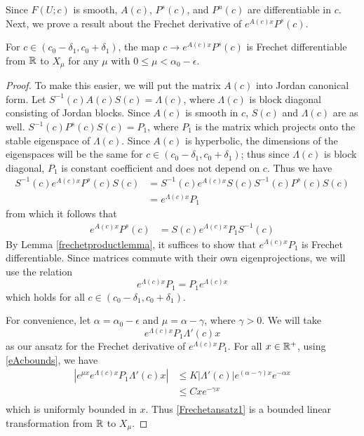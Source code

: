 \documentclass[thesis.tex]{subfiles}
\begin{document}
Since $F(U; c)$ is smooth, $A(c)$, $P^s(c)$, and $P^u(c)$ are differentiable in $c$. Next, we prove a result about the Frechet derivative of $e^{A(c)x} P^s(c)$.

\begin{lemma}\label{EAPsderiv}
For $c \in (c_0 - \delta_1, c_0 + \delta_1)$, the map $c \rightarrow e^{A(c)x} P^s(c)$ is Frechet differentiable from $\mathbb{R}$ to $X_\mu$ for any $\mu$ with $0 \leq \mu < \alpha_0 - \epsilon$.
\begin{proof}
To make this easier, we will put the matrix $A(c)$ into Jordan canonical form. Let $S^{-1}(c)A(c)S(c) = \Lambda(c)$, where $\Lambda(c)$ is block diagonal consisting of Jordan blocks. Since $A(c)$ is smooth in $c$, $S(c)$ and $\Lambda(c)$ are as well. $S^{-1}(c)P^s(c)S(c) = P_1$, where $P_1$ is the matrix which projects onto the stable eigenspace of $\Lambda(c)$. Since $A(c)$ is hyperbolic, the dimensions of the eigenspaces will be the same for $c \in (c_0 - \delta_1, c_0 + \delta_1)$; thus since $\Lambda(c)$ is block diagonal, $P_1$ is constant coefficient and does not depend on $c$. Thus we have
\begin{align*}
S^{-1}(c) e^{A(c)x} P^s(c) S(c) &=  
S^{-1}(c) e^{A(c)x} S(c) S^{-1}(c) P^s(c) S(c) \\
&= e^{\Lambda(c)x}P_1 
\end{align*}
from which it follows that
\begin{align*}
e^{A(c)x} P^s(c) 
&= S(c) e^{\Lambda(c)x} P_1 S^{-1}(c)
\end{align*}
By Lemma \ref{frechetproductlemma}, it suffices to show that $e^{\Lambda(c)x} P_1$ is Frechet differentiable. Since matrices commute with their own eigenprojections, we will use the relation
\begin{equation}\label{P1commutes}
e^{\Lambda(c)x} P_1 = P_1 e^{\Lambda(c)x}
\end{equation}
which holds for all $c \in (c_0 - \delta_1, c_0 + \delta_1)$. 

For convenience, let $\alpha = \alpha_0 - \epsilon$ and $\mu = \alpha - \gamma$, where $\gamma > 0$. We will take
\begin{equation}\label{Frechetansatz1}
e^{\Lambda(c)x} P_1 \Lambda'(c)x
\end{equation}
as our ansatz for the Frechet derivative of $e^{\Lambda(c)x} P_1$. For all $x \in \mathbb{R}^+$, using \eqref{eAcbounds}, we have
\begin{align*}
\left| e^{\mu x} e^{\Lambda(c)x} P_1 \Lambda'(c)x \right| 
&\leq K|\Lambda'(c)| e^{(\alpha - \gamma) x} e^{-\alpha x} \\
&\leq C x e^{-\gamma x} \\
\end{align*} 
which is uniformly bounded in $x$. Thus \eqref{Frechetansatz1} is a bounded linear transformation from $\mathbb{R}$ to $X_\mu$.


\end{proof}
\end{lemma}
\end{document}
